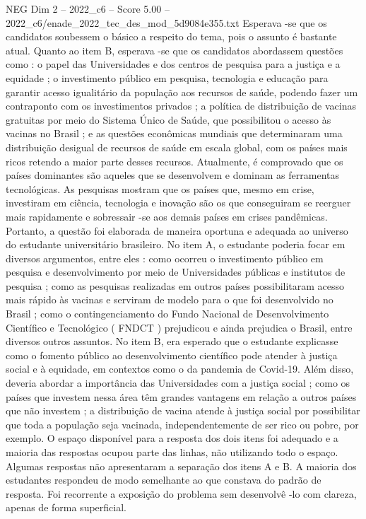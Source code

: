 \begin{textsample}{NEG Dim 2 – 2022\_c6 – Score 5.00 – 2022\_c6/enade\_2022\_tec\_des\_mod\_5d9084e355.txt}
Esperava -se que os candidatos soubessem o básico a respeito do tema, pois o assunto é bastante atual.
Quanto ao item B, esperava -se que os candidatos abordassem questões como : o papel das Universidades e dos centros de pesquisa para a justiça e a equidade ; o investimento público em pesquisa, tecnologia e educação para garantir acesso igualitário da população aos recursos de saúde, podendo fazer um contraponto com os investimentos privados ; a política de distribuição de vacinas gratuitas por meio do Sistema Único de Saúde, que possibilitou o acesso às vacinas no Brasil ; e as questões econômicas mundiais que determinaram uma distribuição desigual de recursos de saúde em escala global, com os países mais ricos retendo a maior parte desses recursos.
Atualmente, é comprovado que os países dominantes são aqueles que se desenvolvem e dominam as ferramentas tecnológicas.
As pesquisas mostram que os países que, mesmo em crise, investiram em ciência, tecnologia e inovação são os que conseguiram se reerguer mais rapidamente e sobressair -se aos demais países em crises pandêmicas.
Portanto, a questão foi elaborada de maneira oportuna e adequada ao universo do estudante universitário brasileiro.
No item A, o estudante poderia focar em diversos argumentos, entre eles : como ocorreu o investimento público em pesquisa e desenvolvimento por meio de Universidades públicas e institutos de pesquisa ; como as pesquisas realizadas em outros países possibilitaram acesso mais rápido às vacinas e serviram de modelo para o que foi desenvolvido no Brasil ; como o contingenciamento do Fundo Nacional de Desenvolvimento Científico e Tecnológico ( FNDCT ) prejudicou e ainda prejudica o Brasil, entre diversos outros assuntos.
No item B, era esperado que o estudante explicasse como o fomento público ao desenvolvimento científico pode atender à justiça social e à equidade, em contextos como o da pandemia de Covid-19.
Além disso, deveria abordar a importância das Universidades com a justiça social ; como os países que investem nessa área têm grandes vantagens em relação a outros países que não investem ; a distribuição de vacina atende à justiça social por possibilitar que toda a população seja vacinada, independentemente de ser rico ou pobre, por exemplo.
O espaço disponível para a resposta dos dois itens foi adequado e a maioria das respostas ocupou parte das linhas, não utilizando todo o espaço.
Algumas respostas não apresentaram a separação dos itens A e B.
A maioria dos estudantes respondeu de modo semelhante ao que constava do padrão de resposta.
Foi recorrente a exposição do problema sem desenvolvê -lo com clareza, apenas de forma superficial.

\end{textsample}
